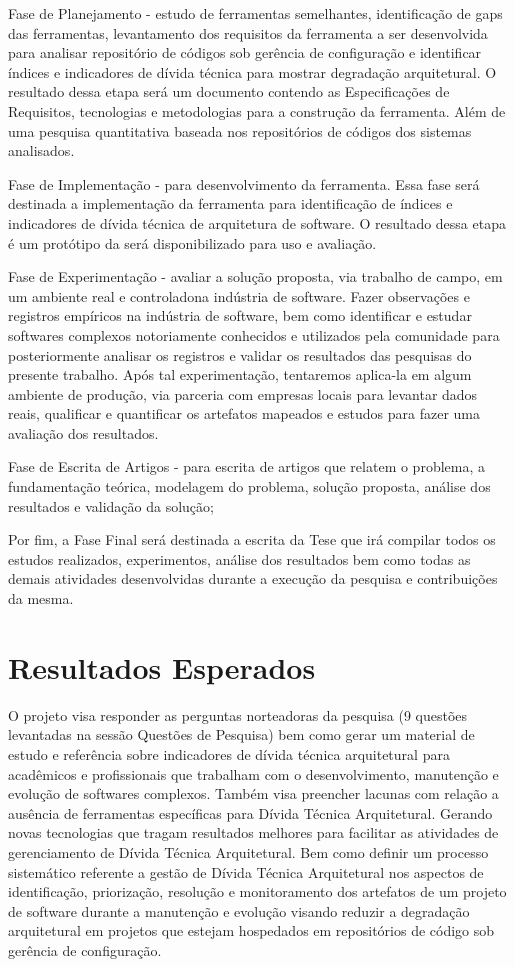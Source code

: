 \documentclass[
	12pt,				%
	openright,			%
	twoside,			%
	a4paper,			%
	english,			%
	french,				%
	spanish,			%
	brazil,				%
	]{abntex2}
\begin{document}
Fase de Planejamento - estudo de ferramentas semelhantes, identificação
de gaps das ferramentas, levantamento dos requisitos da ferramenta
a ser desenvolvida para analisar repositório de códigos sob gerência
de configuração e identificar índices e indicadores de dívida técnica
para mostrar degradação arquitetural. O resultado dessa etapa será
um documento contendo as Especificações de Requisitos, tecnologias
e metodologias para a construção da ferramenta. Além de uma pesquisa
quantitativa baseada nos repositórios de códigos dos sistemas analisados.

Fase de Implementação - para desenvolvimento da ferramenta. Essa fase
será destinada a implementação da ferramenta para identificação de
índices e indicadores de dívida técnica de arquitetura de software.
O resultado dessa etapa é um protótipo da será disponibilizado para
uso e avaliação. 

Fase de Experimentação - avaliar a solução proposta, via trabalho
de campo, em um ambiente real e controladona indústria de software.
Fazer observações e registros empíricos na indústria de software,
bem como identificar e estudar softwares complexos notoriamente conhecidos
e utilizados pela comunidade para posteriormente analisar os registros
e validar os resultados das pesquisas do presente trabalho. Após tal
experimentação, tentaremos aplica-la em algum ambiente de produção,
via parceria com empresas locais para levantar dados reais, qualificar
e quantificar os artefatos mapeados e estudos para fazer uma avaliação
dos resultados. 

Fase de Escrita de Artigos - para escrita de artigos que relatem o
problema, a fundamentação teórica, modelagem do problema, solução
proposta, análise dos resultados e validação da solução; 

Por fim, a Fase Final será destinada a escrita da Tese que irá compilar
todos os estudos realizados, experimentos, análise dos resultados
bem como todas as demais atividades desenvolvidas durante a execução
da pesquisa e contribuições da mesma.

\chapter{Resultados Esperados}

O projeto visa responder as perguntas norteadoras da pesquisa (9 questões
levantadas na sessão Questões de Pesquisa) bem como gerar um material
de estudo e referência sobre indicadores de dívida técnica arquitetural
para acadêmicos e profissionais que trabalham com o desenvolvimento,
manutenção e evolução de softwares complexos. Também visa preencher
lacunas com relação a ausência de ferramentas específicas para Dívida
Técnica Arquitetural. Gerando novas tecnologias que tragam resultados
melhores para facilitar as atividades de gerenciamento de Dívida Técnica
Arquitetural. Bem como definir um processo sistemático referente a
gestão de Dívida Técnica Arquitetural nos aspectos de identificação,
priorização, resolução e monitoramento dos artefatos de um projeto
de software durante a manutenção e evolução visando reduzir a degradação
arquitetural em projetos que estejam hospedados em repositórios de
código sob gerência de configuração. 
\end{document}
